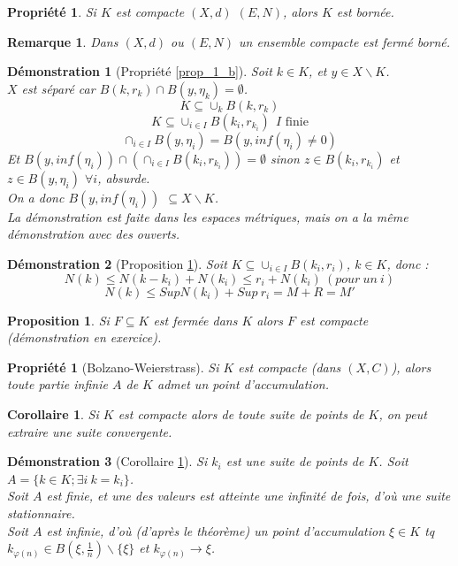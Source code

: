 \documentclass[a4paper, oneside]{report}
\theoremstyle{break}
\newtheorem{propr}[thm]{Propriété}
\newtheorem{propo}[thm]{Proposition}
\newtheorem{cor}[thm]{Corollaire}
\newtheorem*{demo}{Démonstration}
\newtheorem{remar}[thm]{Remarque}
\newcommand{\fracun}[1]{\frac{1}{#1}}
\begin{document}
\begin{propr}
\label{prop_2_b}
Si $K$ est compacte $(X,d)$ $(E,N)$, alors $K$ est bornée.
\end{propr}

\begin{remar}
Dans $(X,d)$ ou $(E,N)$ un ensemble compacte est fermé borné.\\
\end{remar}

\begin{demo}[Propriété \ref{prop_1_b}]
Soit $k\in K$, et $y\in X\backslash K$.\\
$X$ est séparé car $B(k,r_k)\cap B(y,\eta_k)=\emptyset$.\\
$$K\subseteq \cup_k B(k,r_k)$$
$$K\subseteq \cup_{i\in I} B(k_i,r_{k_i}) ~~I\text{ finie}$$
$$\cap_{i\in I} B(y,\eta_i)=B(y,inf(\eta_i)\neq 0)$$
Et $B(y,inf(\eta_i))\cap (\cap_{i\in I} B(k_i,r_{k_i})) = \emptyset$ sinon $z\in B(k_i,r_{k_i})$ et $z\in B(y,\eta_i)$ $\forall i$, absurde.\\
On a donc $B(y,inf(\eta_i))$ $\subseteq X\backslash K$.\\
La démonstration est faite dans les espaces métriques, mais on a la même démonstration avec des ouverts.
\end{demo}

\begin{demo}[Proposition \ref{prop_2_b}]
Soit $K\subseteq \cup_{i\in I} B(k_i,r_i)$, $k\in K$, donc :
$$N(k) \leq N(k-k_i)+N(k_i) \leq r_i+N(k_i)~(pour~un~i)$$
$$N(k) \leq Sup N(k_i) + Sup~r_i = M+R=M'$$
\end{demo}


\begin{propo}
Si $F \subseteq K$ est fermée dans $K$ alors $F$ est compacte (démonstration en exercice).
\end{propo}

\begin{propr}[Bolzano-Weierstrass]
\label{BW}
Si $K$ est compacte (dans $(X,C)$), alors toute partie infinie $A$ de $K$ admet un point d'accumulation.
\end{propr}


\begin{cor}
\label{cor_1}
Si $K$ est compacte alors de toute suite de points de $K$, on peut extraire une suite convergente.
\end{cor}

\begin{demo}[Corollaire \ref{cor_1}]
Si $k_i$ est une suite de points de $K$. Soit $A=\{k\in K;\exists i~k=k_i \}$.\\
Soit $A$ est finie, et une des valeurs est atteinte une infinité de fois, d'où une suite stationnaire.\\
Soit $A$ est infinie, d'où (d'après le théorème) un point d'accumulation $\xi \in K$ tq $k_{\varphi(n)}\in B(\xi, \fracun{n})\backslash \{\xi\}$ et $k_{\varphi(n)} \rightarrow \xi$.\\
\end{demo}
\end{document}
